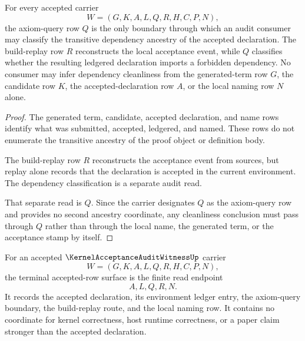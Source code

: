 \begin{theorem}
\label{thm:kernel-acceptance-audit-witness-axiom-query-boundary}
For every accepted carrier
$$
W=(G,K,A,L,Q,R,H,C,P,N),
$$
the axiom-query row $Q$ is the only boundary through which an audit consumer may classify the transitive dependency ancestry of the accepted declaration. The build-replay row $R$ reconstructs the local acceptance event, while $Q$ classifies whether the resulting ledgered declaration imports a forbidden dependency. No consumer may infer dependency cleanliness from the generated-term row $G$, the candidate row $K$, the accepted-declaration row $A$, or the local naming row $N$ alone.
\end{theorem}
\begin{proof}
The generated term, candidate, accepted declaration, and name rows identify what was submitted, accepted, ledgered, and named. These rows do not enumerate the transitive ancestry of the proof object or definition body.

The build-replay row $R$ reconstructs the acceptance event from sources, but replay alone records that the declaration is accepted in the current environment. The dependency classification is a separate audit read.

That separate read is $Q$. Since the carrier designates $Q$ as the axiom-query row and provides no second ancestry coordinate, any cleanliness conclusion must pass through $Q$ rather than through the local name, the generated term, or the acceptance stamp by itself.
\end{proof}

\begin{definition}
\label{def:kernel-acceptance-audit-witness-terminal-row}
For an accepted $\KernelAcceptanceAuditWitnessUp$ carrier
$$
W=(G,K,A,L,Q,R,H,C,P,N),
$$
the terminal accepted-row surface is the finite read endpoint
$$
A,L,Q,R,N.
$$
It records the accepted declaration, its environment ledger entry, the axiom-query boundary, the build-replay route, and the local naming row. It contains no coordinate for kernel correctness, host runtime correctness, or a paper claim stronger than the accepted declaration.
\end{definition}

